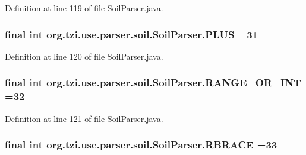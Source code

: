 Definition at line 119 of file Soil\-Parser.\-java.

\hypertarget{classorg_1_1tzi_1_1use_1_1parser_1_1soil_1_1_soil_parser_a8c903b443c9dde42fca400b1e64dda02}{
\subsubsection[{P\-L\-U\-S}]{\setlength{\rightskip}{0pt plus 5cm}final int org.\-tzi.\-use.\-parser.\-soil.\-Soil\-Parser.\-P\-L\-U\-S =31\hspace{0.3cm}{\ttfamily [static]}}}\label{classorg_1_1tzi_1_1use_1_1parser_1_1soil_1_1_soil_parser_a8c903b443c9dde42fca400b1e64dda02}


Definition at line 120 of file Soil\-Parser.\-java.

\hypertarget{classorg_1_1tzi_1_1use_1_1parser_1_1soil_1_1_soil_parser_aea853b9de498cfbb1e7541eeb2086886}{
\subsubsection[{R\-A\-N\-G\-E\-\_\-\-O\-R\-\_\-\-I\-N\-T}]{\setlength{\rightskip}{0pt plus 5cm}final int org.\-tzi.\-use.\-parser.\-soil.\-Soil\-Parser.\-R\-A\-N\-G\-E\-\_\-\-O\-R\-\_\-\-I\-N\-T =32\hspace{0.3cm}{\ttfamily [static]}}}\label{classorg_1_1tzi_1_1use_1_1parser_1_1soil_1_1_soil_parser_aea853b9de498cfbb1e7541eeb2086886}


Definition at line 121 of file Soil\-Parser.\-java.

\hypertarget{classorg_1_1tzi_1_1use_1_1parser_1_1soil_1_1_soil_parser_a0d7db98c24cd99e4779b612b3e06206e}{
\subsubsection[{R\-B\-R\-A\-C\-E}]{\setlength{\rightskip}{0pt plus 5cm}final int org.\-tzi.\-use.\-parser.\-soil.\-Soil\-Parser.\-R\-B\-R\-A\-C\-E =33\hspace{0.3cm}{\ttfamily [static]}}}\label{classorg_1_1tzi_1_1use_1_1parser_1_1soil_1_1_soil_parser_a0d7db98c24cd99e4779b612b3e06206e}


